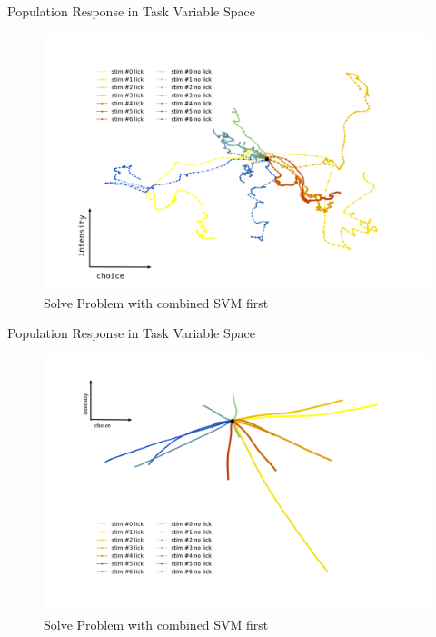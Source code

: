 \documentclass[10pt]{beamer}
\begin{document}
\begin{frame}[fragile]{Population Response in Task Variable Space}
\begin{center}
	\begin{figure}
	\caption*{Solve Problem with combined SVM first}
      \includegraphics[width=1.0\textwidth]{reg.png}
	\end{figure}
	\end{center}
\end{frame}

\begin{frame}[fragile]{Population Response in Task Variable Space}
\begin{center}
	\begin{figure}
	\caption*{Solve Problem with combined SVM first}
      \includegraphics[width=1.0\textwidth]{reg_sum.png}
	\end{figure}
	\end{center}
\end{frame}
\end{document}
